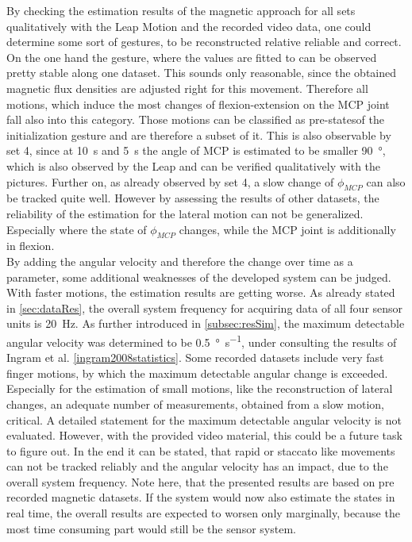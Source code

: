 By checking the estimation results of the magnetic approach for all sets qualitatively with the Leap Motion and the recorded video data, one could determine some sort of gestures, to be reconstructed relative reliable and correct. On the one hand the gesture, where the values are fitted to can be observed pretty stable along one dataset. This sounds only reasonable, since the obtained magnetic flux densities are adjusted right for this movement. Therefore all motions, which induce the most changes of flexion-extension on the \ac{MCP} joint fall also into this category. Those motions can be classified as \grqq pre-states\grqq of the initialization gesture and are therefore a subset of it. This is also observable by set 4, since at \SI{10}{\second} and \SI{5}{\second} the angle of \ac{MCP} is estimated to be smaller \SI{90}{\degree}, which is also observed by the Leap and can be verified qualitatively with the pictures. Further on, as already observed by set 4, a slow change of $ \phi_{MCP} $ can also be tracked quite well. However by assessing the results of other datasets, the reliability of the estimation for the lateral motion can not be generalized. Especially where the state of $ \phi_{MCP} $ changes, while the \ac{MCP} joint is additionally in flexion.\\ 
By adding the angular velocity and therefore the change over time as a parameter, some additional weaknesses of the developed system can be judged. With faster motions, the estimation results are getting worse. As already stated in \ref{sec:dataRes}, the overall system frequency for acquiring data of all four sensor units is \SI{20}{\Hz}. As further introduced in \ref{subsec:resSim}, the maximum detectable angular velocity was determined to be \SI[per-mode=symbol]{0.5}{\degree \per \second}, under consulting the results of Ingram et al. \ref{ingram2008statistics}. Some recorded datasets include very fast finger motions, by which the maximum detectable angular change is exceeded. Especially for the estimation of small motions, like the reconstruction of lateral changes, an adequate number of measurements, obtained from a slow motion, critical. A detailed statement for the maximum detectable angular velocity is not evaluated. However, with the provided video material, this could be a future task to figure out. In the end it can be stated, that rapid or staccato like movements can not be tracked reliably and the angular velocity has an impact, due to the overall system frequency. Note here, that the presented results are based on pre recorded magnetic datasets. If the system would now also estimate the states in real time, the overall results are expected to worsen only marginally, because the most time consuming part would still be the sensor system.\\
